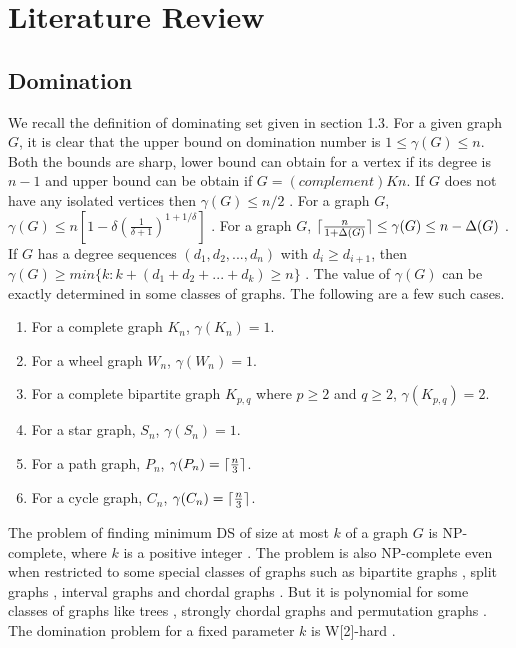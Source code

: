\chapter{Literature Review}
\section{Domination}
\noindent
We recall the definition of dominating set given in section 1.3. For a given graph $G$, it is clear that the upper bound on domination number is $1 \leq \gamma(G) \leq n$. Both the bounds are sharp, lower bound can obtain for a vertex if its degree is $n-1$ and upper bound can be obtain if $G=(complement)Kn$. If $G$ does not have any isolated vertices then $\gamma(G) \leq n/2$ \cite{Haynes,Ore}. For a graph $G$, $\gamma(G) \leq n[ 1 - \delta (\frac{1}{\delta + 1})^{1+1/ \delta} ]$ \cite{Caro,Haynes}. For a graph $G$, $\lceil\frac{n}{1+\Delta(G)}\rceil \leq \gamma(G) \leq n - \Delta(G)$ \cite{Berge,Haynes}. \\
\noindent
If $G$ has a degree sequences $(d_1,d_2,...,d_n)$ with $d_i \geq d_{i+1}$, then $\gamma(G) \geq min\{ k: k+(d_1+d_2+...+d_k)\geq n\}$ \cite{slater}.
The value of $\gamma(G)$ can be exactly determined in some classes of graphs. The following are a few such cases.
\begin{enumerate}[nolistsep]
\item
For a complete graph $K_n$, $\gamma(K_n)=1$. 
\item
For a wheel graph $W_n$, $\gamma(W_n)=1$.
\item
For a complete bipartite graph $K_{p,q}$ where $p \geq 2$ and $q \geq 2$, $\gamma(K_{p,q})=2$. 
\item
For a star graph, $S_n$,  $\gamma(S_n)=1$.
\item
For a path graph, $P_n$, $\gamma(P_n)= \lceil\frac{n}{3}\rceil $. 
\item
For a cycle graph, $C_n$, $\gamma(C_n)= \lceil\frac{n}{3}\rceil$.
\end{enumerate} 
\noindent
The problem of finding minimum DS of size at most $k$ of a graph $G$ is NP-complete, where $k$ is a positive integer \cite{Haynes}. The problem is also NP-complete even when restricted to some special classes of graphs such as bipartite graphs \cite{Bertossi}, split graphs \cite{Bertossi}, interval graphs \cite{Haynes} and chordal graphs  \cite{Booth}. But it is polynomial for some classes of graphs like trees \cite{Cockayne2}, strongly chordal graphs \cite{Farber1} and permutation graphs \cite{Farber2}.\\
\noindent
The domination problem for a fixed parameter $k$ is W[2]-hard \cite{ppc}.
